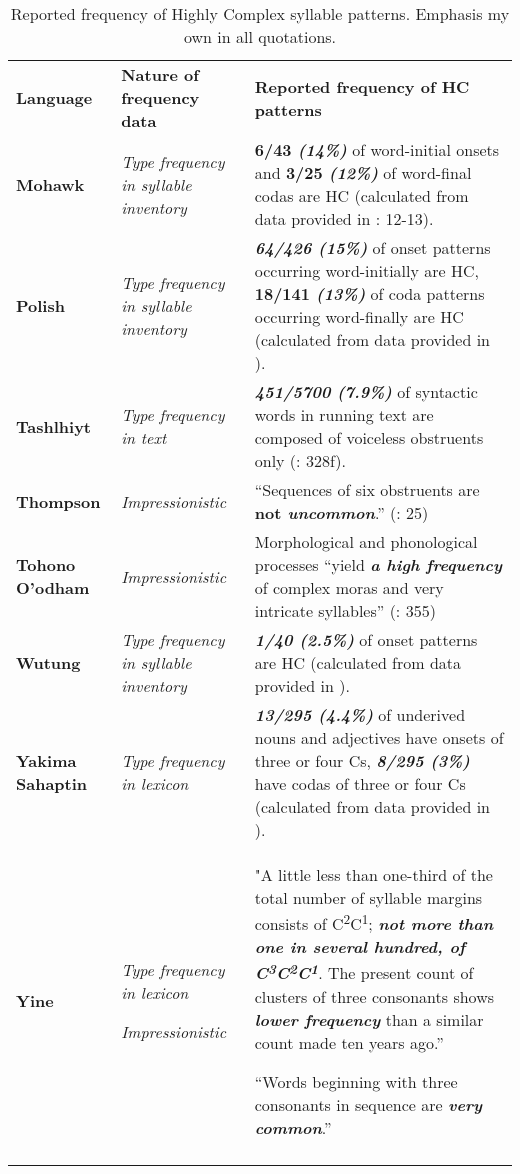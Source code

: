 \begin{table}
\begin{tabularx}{\textwidth}{XXX}
\lsptoprule

\textbf{Language} & \textbf{Nature of frequency data} & \textbf{Reported frequency of HC patterns}\\
\textbf{Mohawk} & \textit{Type frequency in syllable inventory} & \textbf{6/43 \textit{(14\%)}} of word-initial onsets and \textbf{3/25 \textit{(12\%)}} of word-final codas are HC (calculated from data provided in \citealt{Michelson1988}: 12-13).\\
\textbf{Polish} & \textit{Type frequency in syllable inventory} & \textbf{\textit{64/426 (15\%)}} of onset patterns occurring word-initially are HC,\textbf{ \textbf{18/141} \textit{(13\%)}} of coda patterns occurring word-finally are HC (calculated from data provided in \citealt{Bargiełowna1950}).\\
{\bfseries Tashlhiyt} & \textit{Type frequency in text} & \textbf{\textit{451/5700 (7.9\%)}} of syntactic words in running text are composed of voiceless obstruents only (\citealt{Ridouane2008}: 328f).\\
\textbf{Thompson} & \textit{Impressionistic} & “Sequences of six obstruents are\textbf{ \textbf{not} \textit{uncommon}}.” (\citealt{ThompsonThompson1992}: 25)\\
\textbf{Tohono O’odham} & \textit{Impressionistic} & Morphological and phonological processes “yield \textbf{\textit{a high frequency}} of complex moras and very intricate syllables” (\citealt{HillZepeda1992}: 355)\\
\textbf{Wutung} & \textit{Type frequency in syllable inventory} & \textbf{\textit{1/40 (2.5\%)} }of\textbf{ }onset patterns are HC (calculated from data provided in \citealt{Marmion2010}).\\
\textbf{Yakima Sahaptin} & \textit{Type frequency in lexicon} & \textbf{\textit{13/295 (4.4\%)}} of underived nouns and adjectives have onsets of three or four Cs, \textbf{\textit{8/295 (3\%)}} have codas of three or four Cs (calculated from data provided in \citealt{HargusBeavert2006}).\\
\textbf{Yine} & \textit{Type frequency in lexicon}

\textit{Impressionistic} & "A little less than one-third of the total number of syllable margins consists of C\textsuperscript{2}C\textsuperscript{1}; \textbf{\textit{not more than one in several hundred, of C}}\textbf{\textit{\textsuperscript{3}}}\textbf{\textit{C}}\textbf{\textit{\textsuperscript{2}}}\textbf{\textit{C}}\textbf{\textit{\textsuperscript{1}}}. The present count of clusters of three consonants shows \textbf{\textit{lower frequency}} than a similar count made ten years ago.” \citep[24]{Matteson1965}

“Words beginning with three consonants in sequence are \textbf{\textit{very common}}.” \citep[26]{Hanson2010}\\
\lspbottomrule
\end{tabularx}
\caption{\label{tab:3.14cont} Reported frequency of Highly Complex syllable patterns. Emphasis my own in all quotations.}
\end{table}

